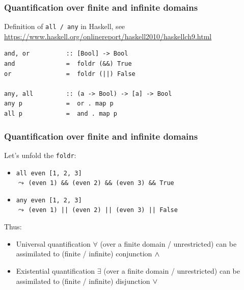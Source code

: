 \documentclass{beamer}
\begin{document}
\begin{frame}[fragile]\frametitle{Quantification over finite and infinite domains}

  Definition of \texttt{all / any} in Haskell, see\\
  \url{https://www.haskell.org/onlinereport/haskell2010/haskellch9.html}

  \begin{lstlisting}
and, or          :: [Bool] -> Bool  
and              =  foldr (&&) True  
or               =  foldr (||) False

any, all         :: (a -> Bool) -> [a] -> Bool  
any p            =  or . map p  
all p            =  and . map p 
  \end{lstlisting}
  
\end{frame}

\begin{frame}[fragile]\frametitle{Quantification over finite and infinite domains}

  Let's unfold the \texttt{foldr}:

  \begin{itemize}
  \item \texttt{all even [1, 2, 3]}\\
    $\leadsto$ \texttt{(even 1) \&\& (even 2) \&\& (even 3) \&\& True}
  \item \texttt{any even [1, 2, 3]}\\
    $\leadsto$ \texttt{(even 1) || (even 2) || (even 3) || False}
  \end{itemize}

  Thus:
  \begin{itemize}
  \item Universal quantification $\forall$ (over a finite domain / unrestricted) can be
    assimilated to (finite / infinite) conjunction $\wedge$
  \item Existential quantification $\exists$ (over a finite domain / unrestricted) can be
    assimilated to (finite / infinite) disjunction $\vee$
  \end{itemize}

\end{frame}
\end{document}
